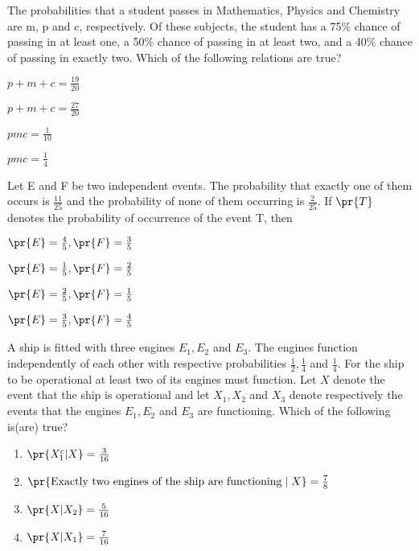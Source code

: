 \item The probabilities that a student passes in Mathematics, Physics and Chemistry are m, p and c, respectively. Of these subjects, the student has a 75\% chance of passing in at least one, a 50\% chance of passing in at least two, and a 40\% chance of passing in exactly two. Which of the following relations are true?
\hfill{}
\begin{enumerate}
\begin{multicols}{2}
\item $p+m+c=\frac{19}{20}$
\item $p+m+c=\frac{27}{20}$
\end{multicols}
\begin{multicols}{2}
\item $pmc=\frac{1}{10}$
\item $pmc=\frac{1}{4}$
\end{multicols}
\end{enumerate}
\item Let E and F be two independent events. The probability that exactly one of them occurs is $\frac{11}{25}$ and the probability of none of them occurring is $\frac{2}{25}$. If $\pr{T}$ denotes the probability of occurrence of the event T, then
\hfill{}
\begin{enumerate}
\begin{multicols}{2}
\item $\pr{E}=\frac{4}{5},\pr{F}=\frac{3}{5}$
\item $\pr{E}=\frac{1}{5},\pr{F}=\frac{2}{5}$
\end{multicols}
\begin{multicols}{2}
\item $\pr{E}=\frac{2}{5},\pr{F}=\frac{1}{5}$
\item $\pr{E}=\frac{3}{5},\pr{F}=\frac{4}{5}$
\end{multicols}
\end{enumerate}
\item A ship is fitted with three engines $E_1,E_2$ and $E_3$. The engines function independently of each other with respective probabilities $\frac{1}{2},\frac{1}{4}$ and $\frac{1}{4}$. For the ship to be operational at least two of its engines must function. Let $X$ denote the event that the ship is operational and let $X_1,X_2$ and $X_3$ denote respectively the events that the engines $E_1,E_2$ and $E_3$ are functioning. Which of the following is(are) true?
\hfill{}
\begin{enumerate}
\item $\pr{X_1^c|X}=\frac{3}{16}$
\item $\pr{\text{Exactly two engines of the ship are functioning}\;|\; X}=\frac{7}{8}$
\item $\pr{X|X_2}=\frac{5}{16}$
\item $\pr{X|X_1}=\frac{7}{16}$
\end{enumerate}
